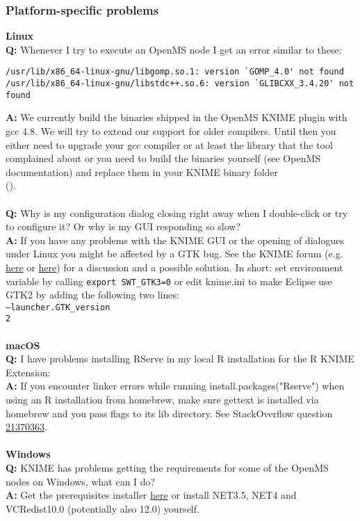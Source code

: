 \subsubsection{Platform-specific problems}
\textbf{Linux}\\
\textbf{Q:} Whenever I try to execute an OpenMS node I get an error similar to these:
\begin{verbatim}
/usr/lib/x86_64-linux-gnu/libgomp.so.1: version `GOMP_4.0' not found
/usr/lib/x86_64-linux-gnu/libstdc++.so.6: version `GLIBCXX_3.4.20' not found
\end{verbatim}
\textbf{A:} We currently build the binaries shipped in the OpenMS KNIME plugin with gcc 4.8. We will try to extend our support for older compilers.
Until then you either need to upgrade your gcc compiler
or at least the library that the tool complained about or you need to build the
binaries yourself (see OpenMS documentation) and replace them in your KNIME binary folder\\
().
\\\\
\textbf{Q:} Why is my configuration dialog closing right away when I double-click or try to configure it? Or why is my GUI responding so slow?\\
\textbf{A:} If you have any problems with the KNIME GUI or the opening of dialogues under Linux you might be affected by a
GTK bug. See the KNIME forum (e.g. \href{https://tech.knime.org/forum/knime-general/ubuntu-1604-slow-performance}{here} or \href{https://tech.knime.org/forum/knime-users/knime-300-crashes-after-splash-screen}{here}) for a discussion and a possible solution. In short: set environment variable by calling \texttt{export SWT\_GTK3=0} or edit knime.ini to make Eclipse use GTK2 by adding the following two lines:\\
\texttt{--launcher.GTK\_version\\
2}\\\\
\textbf{macOS}\\
\textbf{Q:} I have problems installing RServe in my local R installation for the R KNIME Extension:\\
\textbf{A:} If you encounter linker errors while running install.packages("Rserve") when using an R installation from homebrew, make sure gettext is installed via homebrew and you pass flags to its lib directory. See StackOverflow question \href{http://stackoverflow.com/questions/21370363/link-error-installing-rcpp-library-not-found-for-lintl}{21370363}.
\\\\
\textbf{Windows}\\
\textbf{Q:} KNIME has problems getting the requirements for some of the OpenMS nodes on Windows, what can I do?\\
\textbf{A:} Get the prerequisites installer \href{\WindowsPrerequisitesLink}{here} or install NET3.5, NET4 and VCRedist10.0 (potentially also 12.0) yourself.\\
